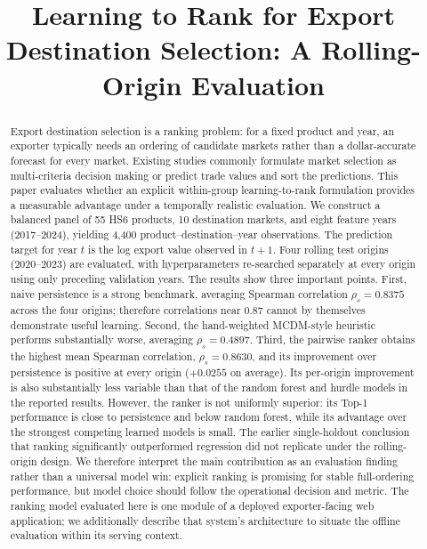\documentclass[conference]{IEEEtran}
\title{Learning to Rank for Export Destination Selection: A Rolling-Origin Evaluation}
\author{
\IEEEauthorblockN{Murala Purnachandra Rao, Nethi Harini, Raya Shashidar Reddy, Patha Suhas}
\IEEEauthorblockA{
Department of Computer Science and Engineering (Data Science)\\
B V Raju Institute of Technology, Narsapur, Medak, Telangana, India\\
\{purnachandrarao.m,23211a6780,23211a67a1,23211a6787\}@bvrit.ac.in}
}
\begin{document}
\maketitle

\begin{abstract}
Export destination selection is a ranking problem: for a fixed product and year, an exporter typically needs an ordering of candidate markets rather than a dollar-accurate forecast for every market. Existing studies commonly formulate market selection as multi-criteria decision making or predict trade values and sort the predictions. This paper evaluates whether an explicit within-group learning-to-rank formulation provides a measurable advantage under a temporally realistic evaluation. We construct a balanced panel of 55 HS6 products, 10 destination markets, and eight feature years (2017--2024), yielding 4,400 product--destination--year observations. The prediction target for year $t$ is the log export value observed in $t+1$. Four rolling test origins (2020--2023) are evaluated, with hyperparameters re-searched separately at every origin using only preceding validation years. The results show three important points. First, naive persistence is a strong benchmark, averaging Spearman correlation $\rho_s=0.8375$ across the four origins; therefore correlations near 0.87 cannot by themselves demonstrate useful learning. Second, the hand-weighted MCDM-style heuristic performs substantially worse, averaging $\rho_s=0.4897$. Third, the pairwise ranker obtains the highest mean Spearman correlation, $\rho_s=0.8630$, and its improvement over persistence is positive at every origin ($+0.0255$ on average). Its per-origin improvement is also substantially less variable than that of the random forest and hurdle models in the reported results. However, the ranker is not uniformly superior: its Top-1 performance is close to persistence and below random forest, while its advantage over the strongest competing learned models is small. The earlier single-holdout conclusion that ranking significantly outperformed regression did not replicate under the rolling-origin design. We therefore interpret the main contribution as an evaluation finding rather than a universal model win: explicit ranking is promising for stable full-ordering performance, but model choice should follow the operational decision and metric. The ranking model evaluated here is one module of a deployed exporter-facing web application; we additionally describe that system's architecture to situate the offline evaluation within its serving context.
\end{abstract}
\end{document}
